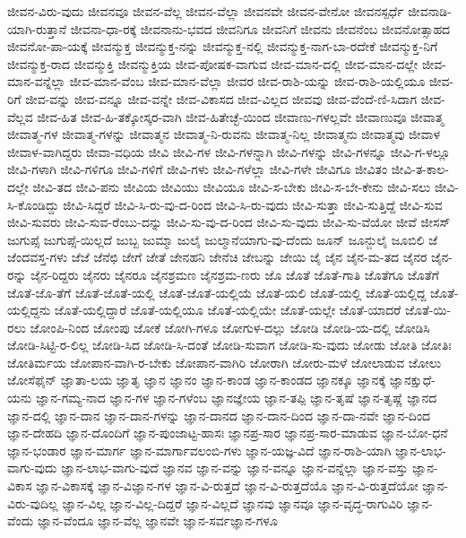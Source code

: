 {ಜೀವನ-ವಿರು-ವುದು
ಜೀವನವೂ
ಜೀವನ-ವೆಲ್ಲ
ಜೀವನ-ವೆಲ್ಲಾ
ಜೀವನವೇ
ಜೀವನ-ವೇನೋ
ಜೀವನಸ್ಪರ್ಧೆ
ಜೀವನಾಡಿ-ಯಾಗಿ-ರುತ್ತಾನೆ
ಜೀವನಾ-ಧಾ-ರಕ್ಕೆ
ಜೀವನಾನು-ಭವದ
ಜೀವನಿಗೂ
ಜೀವನಿಗೆ
ಜೀವನು
ಜೀವನೆಂಬ
ಜೀವನೋತ್ಸಾಹದ
ಜೀವನೋ-ಪಾ-ಯಕ್ಕೆ
ಜೀವನ್ಮುಕ್ತ
ಜೀವನ್ಮುಕ್ತ-ನನ್ನು
ಜೀವನ್ಮುಕ್ತ-ನಲ್ಲಿ
ಜೀವನ್ಮುಕ್ತ-ನಾಗ-ಬಾ-ರದೇಕೆ
ಜೀವನ್ಮುಕ್ತ-ನಿಗೆ
ಜೀವನ್ಮುಕ್ತ-ರಾದ
ಜೀವನ್ಮುಕ್ತಿ
ಜೀವನ್ಮುಕ್ತಿಯ
ಜೀವ-ಪೋಷಕ-ವಾಗುವ
ಜೀವ-ಮಾನ-ದಲ್ಲಿ
ಜೀವ-ಮಾನ-ದಲ್ಲೇ
ಜೀವ-ಮಾನ-ವನ್ನೆಲ್ಲಾ
ಜೀವ-ಮಾನ-ವೆಂಬ
ಜೀವ-ಮಾನ-ವೆಲ್ಲಾ
ಜೀವರ
ಜೀವ-ರಾಶಿ-ಯನ್ನು
ಜೀವ-ರಾಶಿ-ಯಲ್ಲಿಯೂ
ಜೀವ-ರಿಗೆ
ಜೀವ-ವನ್ನು
ಜೀವ-ವನ್ನೂ
ಜೀವ-ವನ್ನೇ
ಜೀವ-ವಿಕಾಸದ
ಜೀವ-ವಿಲ್ಲದ
ಜೀವವು
ಜೀವ-ವೆಂದೆ-ಣಿ-ಸಿದಾಗ
ಜೀವ-ವೆಲ್ಲವ
ಜೀವ-ಹಿತ
ಜೀವ-ಹಿ-ತಕ್ಕೋಸ್ಕರ-ವಾಗಿ
ಜೀವ-ಹಿತೇಚ್ಛೆ-ಯಿಂದ
ಜೀವಾಣು-ಗಳಲ್ಲವೇ
ಜೀವಾಣುವೂ
ಜೀವಾತ್ಮ
ಜೀವಾತ್ಮ-ಗಳ
ಜೀವಾತ್ಮ-ಗಳನ್ನು
ಜೀವಾತ್ಮನ
ಜೀವಾತ್ಮ-ನಿ-ರುವನು
ಜೀವಾತ್ಮ-ನಿಲ್ಲ
ಜೀವಾತ್ಮನು
ಜೀವಾತ್ಮವು
ಜೀವಾಳ
ಜೀವಾಳ-ವಾಗಿದ್ದರು
ಜೀವಾ-ವಧಿಯ
ಜೀವಿ
ಜೀವಿ-ಗಳ
ಜೀವಿ-ಗಳನ್ನಾಗಿ
ಜೀವಿ-ಗಳನ್ನು
ಜೀವಿ-ಗಳನ್ನೂ
ಜೀವಿ-ಗ-ಳಲ್ಲೂ
ಜೀವಿ-ಗಳಾಗಿ
ಜೀವಿ-ಗಳಿಗೂ
ಜೀವಿ-ಗಳಿಗೆ
ಜೀವಿ-ಗಳು
ಜೀವಿ-ಗಳೆಲ್ಲಾ
ಜೀವಿ-ಗಳೇ
ಜೀವಿಗೂ
ಜೀವಿತಂ
ಜೀವಿ-ತ-ಕಾಲ-ದಲ್ಲೇ
ಜೀವಿ-ತದ
ಜೀವಿ-ಪನು
ಜೀವಿಯ
ಜೀವಿಯು
ಜೀವಿಯೂ
ಜೀವಿ-ಸ-ಬೇಕು
ಜೀವಿ-ಸ-ಬೇ-ಕೇನು
ಜೀವಿ-ಸಲು
ಜೀವಿ-ಸಿ-ಕೊಂಡಿದ್ದು
ಜೀವಿ-ಸಿದ್ದರೆ
ಜೀವಿ-ಸಿ-ರು-ವು-ದ-ರಿಂದ
ಜೀವಿ-ಸಿ-ರು-ವುದು
ಜೀವಿ-ಸುತ್ತಾ
ಜೀವಿ-ಸುತ್ತಿದ್ದೆ
ಜೀವಿ-ಸುವ
ಜೀವಿ-ಸುವರು
ಜೀವಿ-ಸುವ-ರೆಂಬು-ದನ್ನು
ಜೀವಿ-ಸು-ವು-ದ-ರಿಂದ
ಜೀವಿ-ಸು-ವುದು
ಜೀವಿ-ಸು-ವೆಯೋ
ಜೀವೆ
ಜೀಸಸ್
ಜುಗುಪ್ಸೆ
ಜುಗುಪ್ಸೆ-ಯಿಲ್ಲದೆ
ಜುಬ್ಬ
ಜುಮ್ಮಾ
ಜುಲೈ
ಜುಲ್ಮಾನೆಯಾಗು-ವು-ದೆಂದು
ಜೂನ್
ಜೂನ್ಜುಲೈ
ಜೂಬಿಲಿ
ಜೆ
ಜೆಂದವಸ್ತ-ಗಳು
ಜೆಜೆ
ಜೆನೆಛಿ
ಜೇಗೆ
ಜೇತೆ
ಜೇನಹನಿ
ಜೇನೆಚಿ
ಜೇಬನ್ನು
ಜೇಯಿ
ಜೈ
ಜೈನ
ಜೈನ-ಮ-ತದ
ಜೈನರ
ಜೈನ-ರನ್ನು
ಜೈನ-ರಿದ್ದರು
ಜೈನರು
ಜೈನರೂ
ಜೈನಶ್ರಮಣ
ಜೈನಶ್ರಮ-ಣರು
ಜೊ
ಜೊತೆ
ಜೊತೆ-ಗಾತಿ
ಜೊತೆಗೂ
ಜೊತೆಗೆ
ಜೊತೆ-ಜೊ-ತೆಗೆ
ಜೊತೆ-ಜೊತೆ-ಯಲ್ಲಿ
ಜೊತೆ-ಜೊತೆ-ಯಲ್ಲಿಯೆ
ಜೊತೆ-ಯಲಿ
ಜೊತೆ-ಯಲ್ಲಿ
ಜೊತೆ-ಯಲ್ಲಿದ್ದ
ಜೊತೆ-ಯಲ್ಲಿದ್ದನು
ಜೊತೆ-ಯಲ್ಲಿದ್ದಾರೆ
ಜೊತೆ-ಯಲ್ಲಿಯೂ
ಜೊತೆ-ಯಲ್ಲಿಯೇ
ಜೊತೆ-ಯಲ್ಲೇ
ಜೊತೆ-ಯಾದರೆ
ಜೊತೆ-ಯಿ-ರಲು
ಜೋಂಪಿ-ನಿಂದ
ಜೋಂಪು
ಜೋಕೆ
ಜೋಗಿ-ಗಳೂ
ಜೋಗುಳ-ದಲ್ಲು
ಜೋಡಿ
ಜೋಡಿ-ಯ-ದಲ್ಲಿ
ಜೋಡಿಸಿ
ಜೋಡಿ-ಸಿಟ್ಟಿ-ರ-ಲಿಲ್ಲ
ಜೋಡಿ-ಸಿದ
ಜೋಡಿ-ಸಿ-ದಂತೆ
ಜೋಡಿ-ಸುವಾಗ
ಜೋಡಿ-ಸು-ವುದು
ಜೋಡು
ಜೋತಿ
ಜೋತಿಃ
ಜೋತಿರ್ಮಯ
ಜೋಪಾನ-ವಾಗಿ-ರ-ಬೇಕು
ಜೋಪಾನ-ವಾಗಿರಿ
ಜೋರಾಗಿ
ಜೋರು-ಮಳೆ
ಜೋಲಾಡುವ
ಜೋಲು
ಜೋಸೆಫೈನ್
ಜ್ಞಾತಾ-ಲಯ
ಜ್ಞಾತೃ
ಜ್ಞಾನ
ಜ್ಞಾನಂ
ಜ್ಞಾನ-ಕಾಂಡ
ಜ್ಞಾನ-ಕಾಂಡದ
ಜ್ಞಾನಕ್ಕೂ
ಜ್ಞಾನಕ್ಕೆ
ಜ್ಞಾನಕ್ಷುಧೆ-ಯನು
ಜ್ಞಾನ-ಗಮ್ಯ-ನಾದ
ಜ್ಞಾನ-ಗಳ
ಜ್ಞಾನ-ಗಳೆಂಬ
ಜ್ಞಾನಜ್ಞೇಯ
ಜ್ಞಾನ-ತಪ್ಪಿ
ಜ್ಞಾನ-ತೃಷೆ
ಜ್ಞಾನ-ತೃಷ್ಣೆ
ಜ್ಞಾನದ
ಜ್ಞಾನ-ದಲ್ಲಿ
ಜ್ಞಾನ-ದಾನ
ಜ್ಞಾನ-ದಾನ-ಗಳನ್ನು
ಜ್ಞಾನ-ದಾನದ
ಜ್ಞಾನ-ದಾನ-ದಿಂದ
ಜ್ಞಾನ-ದಾ-ನವೇ
ಜ್ಞಾನ-ದಿಂದ
ಜ್ಞಾನ-ದೇಹದಿ
ಜ್ಞಾನ-ದೊಂದಿಗೆ
ಜ್ಞಾನ-ಪುಂಜಾಟ್ಟ-ಹಾಸಃ
ಜ್ಞಾನಪ್ರ-ಸಾರ
ಜ್ಞಾನಪ್ರ-ಸಾರ-ಮಾಡುವ
ಜ್ಞಾನ-ಬೋ-ಧನೆ
ಜ್ಞಾನ-ಭಂಡಾರ
ಜ್ಞಾನ-ಮಾರ್ಗ
ಜ್ಞಾನ-ಮಾರ್ಗಾವಲಂಬಿ-ಗಳು
ಜ್ಞಾನ-ಯಜ್ಞ-ವಿದೆ
ಜ್ಞಾನ-ರಾಶಿ-ಯಾಗಿ
ಜ್ಞಾನ-ಲಾಭ-ವಾಗು-ವುದು
ಜ್ಞಾನ-ಲಾಭ-ವಾಗು-ವುದೆ
ಜ್ಞಾನವ
ಜ್ಞಾನ-ವನ್ನು
ಜ್ಞಾನ-ವನ್ನೂ
ಜ್ಞಾನ-ವನ್ನೆಲ್ಲಾ
ಜ್ಞಾನ-ವಸ್ತು
ಜ್ಞಾನ-ವಿಕಾಸ
ಜ್ಞಾನ-ವಿಕಾಸಕ್ಕೆ
ಜ್ಞಾನ-ವಿಜ್ಞಾನ-ಗಳ
ಜ್ಞಾನ-ವಿ-ರುತ್ತದೆ
ಜ್ಞಾನ-ವಿ-ರುತ್ತದೆಯೊ
ಜ್ಞಾನ-ವಿ-ರುತ್ತದೆಯೋ
ಜ್ಞಾನ-ವಿರು-ವುದಿಲ್ಲ
ಜ್ಞಾನ-ವಿಲ್ಲ
ಜ್ಞಾನ-ವಿಲ್ಲ-ದಿದ್ದರೆ
ಜ್ಞಾನ-ವಿಲ್ಲದೆ
ಜ್ಞಾನವು
ಜ್ಞಾನವೂ
ಜ್ಞಾನ-ವೃದ್ಧ-ರಾಗುವಿರಿ
ಜ್ಞಾನ-ವೆಂದು
ಜ್ಞಾನ-ವೆಂದೂ
ಜ್ಞಾನ-ವೆಲ್ಲ
ಜ್ಞಾನವೇ
ಜ್ಞಾನ-ಸರ್ವಜ್ಞಾನ-ಗಳೂ
}
